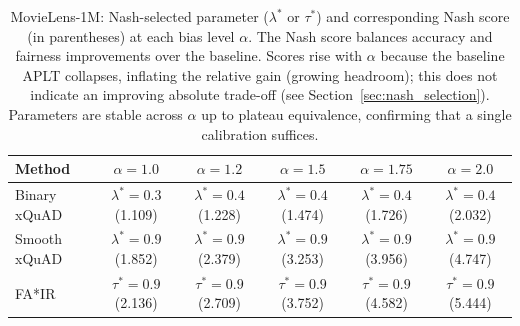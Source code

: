 \begin{table}[htbp]
\centering
\caption{MovieLens-1M: Nash-selected parameter ($\lambda^*$ or $\tau^*$) and corresponding Nash score (in parentheses) at each bias level $\alpha$. The Nash score balances accuracy and fairness improvements over the baseline. Scores rise with $\alpha$ because the baseline APLT collapses, inflating the relative gain (growing headroom); this does not indicate an improving absolute trade-off (see Section~\ref{sec:nash_selection}). Parameters are stable across $\alpha$ up to plateau equivalence, confirming that a single calibration suffices.}
\label{tab:nash_selection_ml}
\begin{tabular}{lccccc}
\toprule
Method & $\alpha=1.0$ & $\alpha=1.2$ & $\alpha=1.5$ & $\alpha=1.75$ & $\alpha=2.0$ \\
\midrule
Binary xQuAD & $\lambda^*=0.3$ (1.109) & $\lambda^*=0.4$ (1.228) & $\lambda^*=0.4$ (1.474) & $\lambda^*=0.4$ (1.726) & $\lambda^*=0.4$ (2.032) \\
\rowcolor{gray!6} Smooth xQuAD & $\lambda^*=0.9$ (1.852) & $\lambda^*=0.9$ (2.379) & $\lambda^*=0.9$ (3.253) & $\lambda^*=0.9$ (3.956) & $\lambda^*=0.9$ (4.747) \\
FA*IR & $\tau^*=0.9$ (2.136) & $\tau^*=0.9$ (2.709) & $\tau^*=0.9$ (3.752) & $\tau^*=0.9$ (4.582) & $\tau^*=0.9$ (5.444) \\
\bottomrule
\end{tabular}
\end{table}
